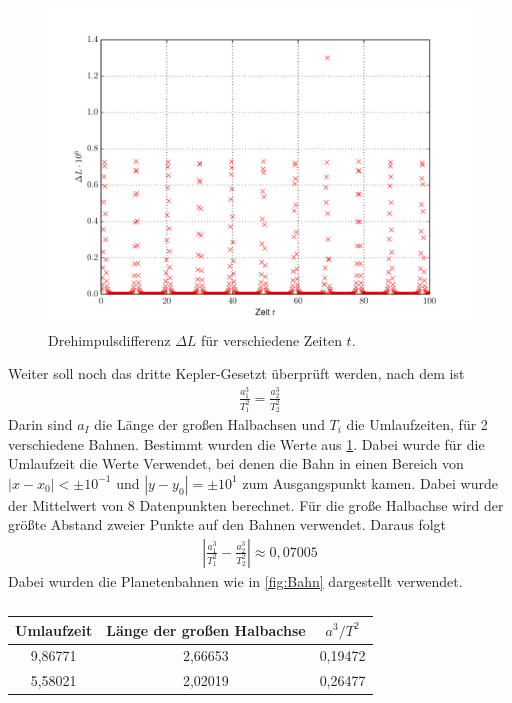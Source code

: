 \begin{figure}[H]
	\centering
	\includegraphics[width = \textwidth]{../Plots/Plot_4_Dreh.pdf}
	\caption{Drehimpulsdifferenz $\Delta L$ für verschiedene Zeiten $t$.\label{fig:Dreh}}
\end{figure}
Weiter soll noch das dritte Kepler-Gesetzt überprüft werden, nach dem ist
\begin{align}
	\frac{a_1^3}{T_1^2}=\frac{a_2^3}{T_2^2}
\end{align}
Darin sind $a_I$ die Länge der großen Halbachsen und $T_i$ die Umlaufzeiten, für 2 verschiedene Bahnen.
Bestimmt wurden die Werte aus \cref{tab:kepler}. Dabei wurde für die Umlaufzeit die Werte Verwendet, bei denen die Bahn in einen Bereich von $|x-x_0|<\pm10^{-1}$ und $|y-y_0|=\pm10^{1}$ zum Ausgangspunkt kamen. Dabei wurde der Mittelwert von 8 Datenpunkten berechnet. Für die große Halbachse wird der größte Abstand zweier Punkte auf den Bahnen verwendet. 
Daraus folgt
\begin{align}
	\left|\frac{a_1^3}{T_1^2}-\frac{a_2^3}{T_2^2}\right|\approx 0,07005
\end{align}
Dabei wurden die Planetenbahnen wie in \cref{fig:Bahn} dargestellt verwendet.
\begin{table}[h!]
	\centering
	\begin{tabular}{c|c|c}
		Umlaufzeit & Länge der großen Halbachse&$a^3/T^2$ \\\hline
		9,86771 & 2,66653 & 0,19472\\
		5,58021 & 2,02019 & 0,26477
	\end{tabular}\caption{\label{tab:kepler}}
\end{table}

